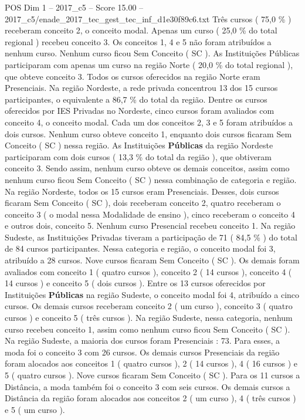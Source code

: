 \begin{textsample}{POS Dim 1 – 2017\_c5 – Score 15.00 – 2017\_c5/enade\_2017\_tec\_gest\_tec\_inf\_d1e30f89c6.txt}
Três cursos ( 75,0 \% ) receberam conceito 2, o conceito modal.
Apenas um curso ( 25,0 \% do total regional ) recebeu conceito 3.
Os conceitos 1, 4 e 5 não foram atribuídos a nenhum curso.
Nenhum curso ficou Sem Conceito ( SC ).
As Instituições Públicas participaram com apenas um curso na região Norte ( 20,0 \% do total regional ), que obteve conceito 3.
Todos os cursos oferecidos na região Norte eram Presenciais.
Na região Nordeste, a rede privada concentrou 13 dos 15 cursos participantes, o equivalente a 86,7 \% do total da região.
Dentre os cursos oferecidos por IES Privadas no Nordeste, cinco cursos foram avaliados com conceito 4, o conceito modal.
Cada um dos conceitos 2, 3 e 5 foram atribuídos a dois cursos.
Nenhum curso obteve conceito 1, enquanto dois cursos ficaram Sem Conceito ( SC ) nessa região.
As Instituições \textbf{Públicas} da região Nordeste participaram com dois cursos ( 13,3 \% do total da região ), que obtiveram conceito 3.
Sendo assim, nenhum curso obteve os demais conceitos, assim como nenhum curso ficou Sem Conceito ( SC ) nessa combinação de categoria e região.
Na região Nordeste, todos os 15 cursos eram Presenciais.
Desses, dois cursos ficaram Sem Conceito ( SC ), dois receberam conceito 2, quatro receberam o conceito 3 ( o modal nessa Modalidade de ensino ), cinco receberam o conceito 4 e outros dois, conceito 5.
Nenhum curso Presencial recebeu conceito 1.
Na região Sudeste, as Instituições Privadas tiveram a participação de 71 ( 84,5 \% ) do total de 84 cursos participantes.
Nessa categoria e região, o conceito modal foi 3, atribuído a 28 cursos.
Nove cursos ficaram Sem Conceito ( SC ).
Os demais foram avaliados com conceito 1 ( quatro cursos ), conceito 2 ( 14 cursos ), conceito 4 ( 14 cursos ) e conceito 5 ( dois cursos ).
Entre os 13 cursos oferecidos por Instituições \textbf{Públicas} na região Sudeste, o conceito modal foi 4, atribuído a cinco cursos.
Os demais cursos receberam conceito 2 ( um curso ), conceito 3 ( quatro cursos ) e conceito 5 ( três cursos ).
Na região Sudeste, nessa categoria, nenhum curso recebeu conceito 1, assim como nenhum curso ficou Sem Conceito ( SC ).
Na região Sudeste, a maioria dos cursos foram Presenciais : 73.
Para esses, a moda foi o conceito 3 com 26 cursos.
Os demais cursos Presenciais da região foram alocados aos conceitos 1 ( quatro cursos ), 2 ( 14 cursos ), 4 ( 16 cursos ) e 5 ( quatro cursos ).
Nove cursos ficaram Sem Conceito ( SC ).
Para os 11 cursos a Distância, a moda também foi o conceito 3 com seis cursos.
Os demais cursos a Distância da região foram alocados aos conceitos 2 ( um curso ), 4 ( três cursos ) e 5 ( um curso ).

\end{textsample}
